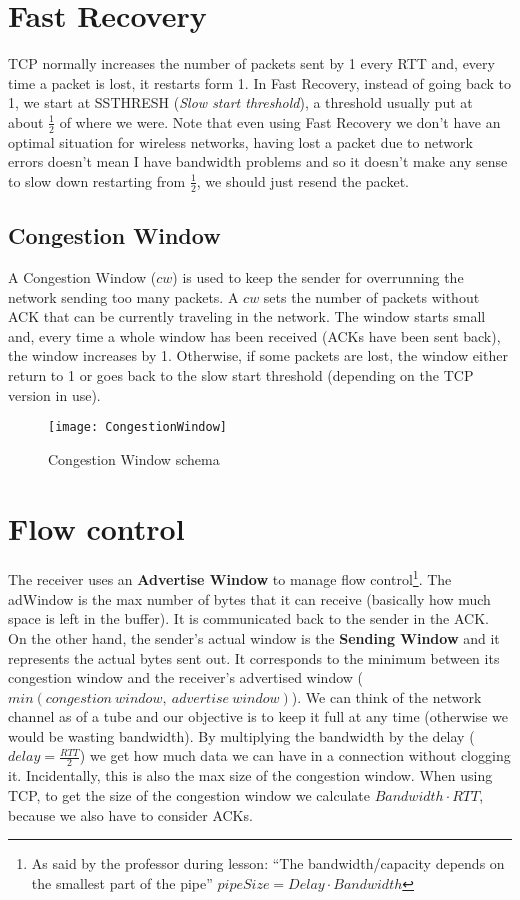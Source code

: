 \section{Fast Recovery}

TCP normally increases the number of 
packets sent by 1 every RTT and, every time a packet is lost, it restarts form
1. In Fast Recovery, instead of going back to 1, we start at SSTHRESH
(\textit{Slow start threshold}), a threshold usually put at about $\frac{1}{2}$
of where we were. Note that even using Fast Recovery we don't have an optimal
situation for wireless networks, having lost a packet due to network errors
doesn't mean I have bandwidth problems and so it doesn't make any sense to slow
down restarting from $\frac{1}{2}$, we should just resend the packet.

\subsection{Congestion Window}
A Congestion Window ($cw$) is used to keep the sender for overrunning the
network sending too many packets. A $cw$ sets the number of packets without ACK
that can be currently traveling in the network. The window starts small and,
every time a whole window has been received (ACKs have been sent back), the
window increases by 1. Otherwise, if some packets are lost, the window either
return to 1 or goes back to the slow start threshold (depending on the TCP
version in use).
\begin{figure}[h]
  \centering
  \texttt{[image: CongestionWindow]}
  \caption{Congestion Window schema}
  \label{fig:tcp:cwschema}
\end{figure}

\section{Flow control}

The receiver uses an \textbf{Advertise Window} to manage flow control\footnote{
  As said by the professor during lesson: ``The bandwidth/capacity depends on
  the smallest part of the pipe'' $pipeSize = Delay \cdot Bandwidth$
}. The adWindow is the max number of bytes that it can receive (basically how
much space is left in the buffer). It is communicated back to the sender in the
ACK. 
On the other hand, the sender's actual window is the \textbf{Sending Window} and 
it represents the actual bytes sent out. It corresponds to the minimum between 
its congestion window and the receiver's advertised window
($min(congestion\ window,\ advertise\ window)$). 
We can think of the network channel as of a tube and our objective is to 
keep it full at any time (otherwise we would be wasting bandwidth). By
multiplying the bandwidth by the delay ($delay = \frac{RTT}{2}$) we get how much
data we can have in a connection without clogging it. Incidentally, this is also
the max size of the congestion window. When using TCP, to get the size of the
congestion window we calculate $Bandwidth \cdot RTT$, because we also have to
consider ACKs.

